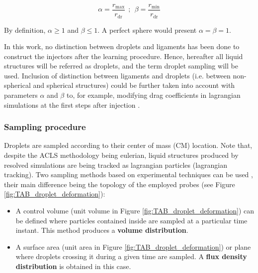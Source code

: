 \begin{equation}
\alpha = \frac{r_\mathrm{max}}{r_\mathrm{dr}} ~~ ; ~~ \beta = \frac{r_\mathrm{min}}{r_\mathrm{dr}}
\end{equation}	

By definition, $\alpha \geq 1$ and $\beta \leq 1$. A perfect sphere would present $\alpha = \beta = 1$.

In this work, no distinction between droplets and ligaments has been done to construct the injectors after the learning procedure. Hence, hereafter all liquid structures will be referred as droplets, and the term droplet sampling will be used. Inclusion of distinction between ligaments and droplets (i.e. between non-spherical and spherical structures) could be further taken into account with parameters $\alpha$ and $\beta$ to, for example, modifying drag coefficients in lagrangian simulations at the first steps after injection . 


\subsubsection*{Sampling procedure}

Droplets are sampled according to their center of mass (CM) location. Note that, despite the ACLS methodology being eulerian, liquid structures produced by resolved simulations are being tracked as lagrangian particles (lagrangian tracking). Two sampling methods based on experimental techniques can be used , their main difference being the topology of the employed probes (see Figure \ref{fig:TAB_droplet_deformation}):

\begin{itemize}

	\item A control volume (unit volume in Figure \ref{fig:TAB_droplet_deformation}) can be defined where particles contained inside are sampled at a particular time instant. This method produces a \textbf{volume distribution}. 
	
	\item A surface area (unit area in Figure \ref{fig:TAB_droplet_deformation}) or plane where droplets crossing it during a given time are sampled. A \textbf{flux density distribution} is obtained in this case.

\end{itemize}


